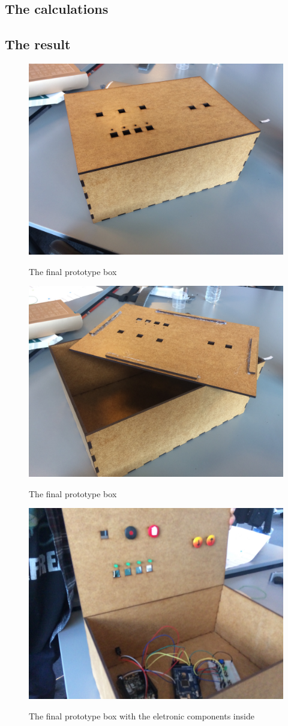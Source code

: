 \subsection{The calculations}

\subsection{The result}


\begin{figure}[H]
	\centering
	\includegraphics[width=0.7\linewidth]{figure/Design/finalbox1}
	\label{fig:finalbox1}
	\caption{The final prototype box}
	
\end{figure}

\begin{figure}[H]
	\centering
	\includegraphics[width=0.7\linewidth]{figure/Design/finalbox2}
	\label{fig:finalbox2}
	\caption{The final prototype box}
	
\end{figure}

\begin{figure}[H]
	\centering
	\includegraphics[width=0.7\linewidth]{figure/Design/finalbox3}
	\label{fig:finalbox3}
	\caption{The final prototype box with the eletronic components inside}
	
\end{figure}






